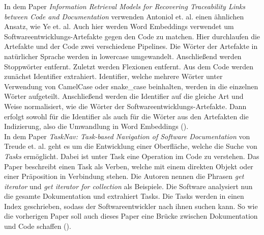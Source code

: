 In dem Paper \textit{Information Retrieval Models for Recovering Traceability Links between Code and Documentation} verwenden Antoniol et. al. einen ähnlichen Ansatz, wie Ye et. al.
Auch hier werden Word Embeddings verwendet um Softwareentwicklungs-Artefakte gegen den Code zu matchen.
Hier durchlaufen die Artefakte und der Code zwei verschiedene Pipelines.
Die Wörter der Artefakte in natürlicher Sprache werden in lowercase umgewandelt.
Anschließend werden Stoppwörter entfernt.
Zuletzt werden Flexionen entfernt.
Aus dem Code werden zunächst Identifier extrahiert.
Identifier, welche mehrere Wörter unter Verwendung von CamelCase oder snake\_case beinhalten, werden in die einzelnen Wörter aufgeteilt.
Anschließend werden die Identifier auf die gleiche Art und Weise normalisiert, wie die Wörter der Softwareentwicklungs-Artefakte.
Dann erfolgt sowohl für die Identifier als auch für die Wörter aus den Artefakten die Indizierung, also die Umwandlung in Word Embeddings (\cite{Antoniol_Canfora_Casazza_DeLucia_2000}).\\

In dem Paper \textit{TaskNav: Task-based Navigation of Software Documentation} von Treude et. al. geht es um die Entwicklung einer Oberfläche, welche die Suche von \textit{Tasks} ermöglicht.
Dabei ist unter Task eine Operation im Code zu verstehen.
Das Paper beschreibt einen Task als Verben, welche mit einem direkten Objekt oder einer Präposition in Verbindung stehen.
Die Autoren nennen die Phrasen \textit{get iterator} und \textit{get iterator for collection} als Beispiele.
Die Software analysiert nun die gesamte Dokumentation und extrahiert Tasks.
Die Tasks werden in einen Index geschrieben, sodass der Softwareentwickler nach ihnen suchen kann. 
So wie die vorherigen Paper soll auch dieses Paper eine Brücke zwischen Dokumentation und Code schaffen (\cite{Treude_Sicard_Klocke_Robillard_2015}).

